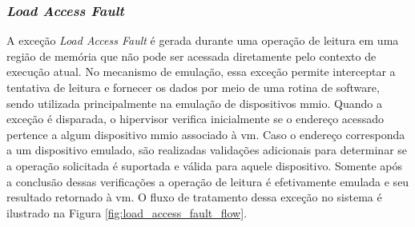 \subsubsection{\textit{Load Access Fault}}
A exceção \textit{Load Access Fault} é gerada durante uma operação de leitura em uma região de memória que não pode ser acessada diretamente pelo contexto de execução atual.
No mecanismo de emulação, essa exceção permite interceptar a tentativa de leitura e fornecer os dados por meio de uma rotina de software, sendo utilizada principalmente na
emulação de dispositivos \gls{mmio}.
Quando a exceção é disparada, o hipervisor verifica inicialmente se o endereço acessado pertence a algum dispositivo \gls{mmio} associado à \gls{vm}.
Caso o endereço corresponda a um dispositivo emulado, são realizadas validações adicionais para determinar se a operação solicitada é suportada e válida para aquele dispositivo.
Somente após a conclusão dessas verificações a operação de leitura é efetivamente emulada e seu resultado retornado à \gls{vm}. O fluxo de tratamento dessa exceção no sistema
é ilustrado na Figura \ref{fig:load_access_fault_flow}.

\vspace{1cm}

